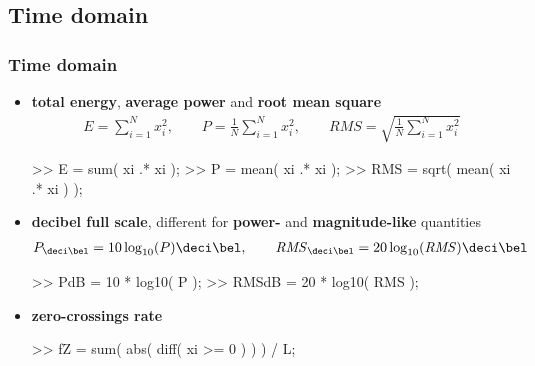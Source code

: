
\subsection{Time domain}

\begin{frame}[fragile]
	\frametitle{Time domain}
	\begin{itemize}
		\item \textbf{total energy}, \textbf{average power} and \textbf{root mean square}
			\begin{align*}
				E=\sum_{i=1}^Nx_i^2,\qquad P=\frac1N\sum_{i=1}^Nx_i^2,\qquad\mathit{RMS}=\sqrt{\frac1N\sum_{i=1}^Nx_i^2}
			\end{align*}
			\begin{code}
>> E = sum( xi .* xi );
>> P = mean( xi .* xi );
>> RMS = sqrt( mean( xi .* xi ) );
			\end{code}
		\item \textbf{decibel full scale}, different for \textbf{power-} and \textbf{magnitude-like} quantities
			\begin{align*}
				P_{\deci\bel}=10\log_{10}(P)\deci\bel,\qquad\mathit{RMS}_{\deci\bel}=20\log_{10}(\mathit{RMS})\deci\bel
			\end{align*}
			\begin{code}
>> PdB = 10 * log10( P ); %
>> RMSdB = 20 * log10( RMS ); %
			\end{code}
		\item \textbf{zero-crossings rate}
			\begin{code}
>> fZ = sum( abs( diff( xi >= 0 ) ) ) / L;
			\end{code}
	\end{itemize}
\end{frame}

